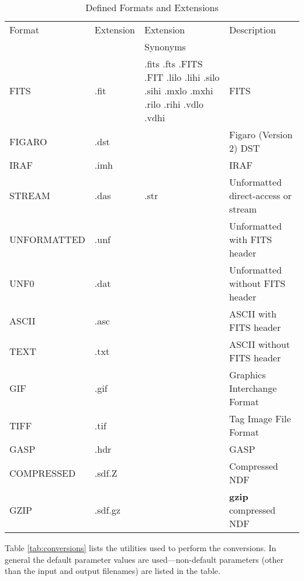 \documentclass[twoside,11pt]{starlink}
\begin{document}
\begin{table}[hb]
\begin{center}
\begin{tabular}{|llp{32mm}l|}
\hline
Format & Extension & Extension & Description \\
       &           & Synonyms  & \\
\hline
FITS        & .fit & .fits .fts .FITS .FIT
                     .lilo .lihi .silo .sihi
                     .mxlo .mxhi .rilo .rihi .vdlo .vdhi & FITS \\
FIGARO      & .dst & & Figaro (Version 2) DST \\
IRAF        & .imh & & IRAF \\
STREAM      & .das & .str & Unformatted direct-access or stream \\
UNFORMATTED & .unf & & Unformatted with FITS header \\
UNF0        & .dat & & Unformatted without FITS header \\
ASCII       & .asc & & ASCII with FITS header \\
TEXT        & .txt & & ASCII without FITS header \\
GIF         & .gif & & Graphics Interchange Format \\
TIFF        & .tif & & Tag Image File Format \\
GASP        & .hdr & & GASP \\
COMPRESSED  & .sdf.Z & & Compressed NDF \\
GZIP        & .sdf.gz & & {\bf gzip} compressed NDF \\
\hline
\end{tabular}
\caption{\label{tab:formats}Defined Formats and Extensions}
\end{center}
\end{table}



\begin{latexonly}
Table \ref{tab:conversions} lists the utilities used to perform the conversions.
In general the default parameter values are used---non-default parameters
(other than the input and output filenames) are listed in the table.
\end{latexonly}
\end{document}
